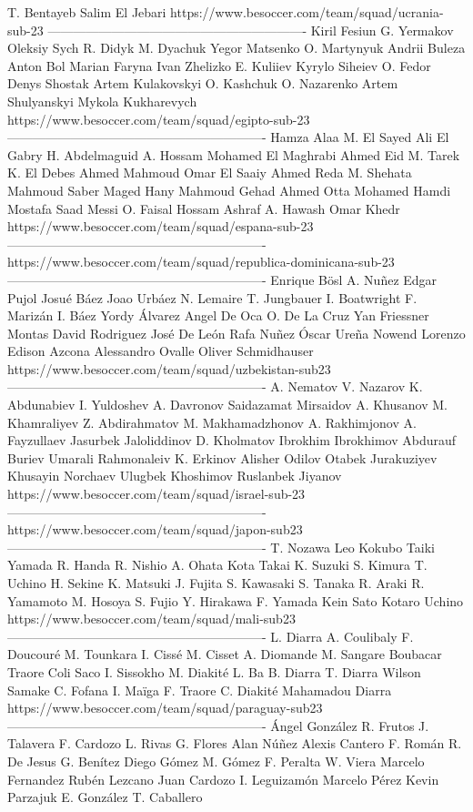 T. Bentayeb
Salim El Jebari
https://www.besoccer.com/team/squad/ucrania-sub-23 
------------------------------------------------------------- 
Kiril Fesiun
G. Yermakov
Oleksiy Sych
R. Didyk
M. Dyachuk
Yegor Matsenko
O. Martynyuk
Andrii Buleza
Anton Bol
Marian Faryna
Ivan Zhelizko
E. Kuliiev
Kyrylo Siheiev
O. Fedor
Denys Shostak
Artem Kulakovskyi
O. Kashchuk
O. Nazarenko
Artem Shulyanskyi
Mykola Kukharevych
https://www.besoccer.com/team/squad/egipto-sub-23 
------------------------------------------------------------- 
Hamza Alaa
M. El Sayed
Ali El Gabry
H. Abdelmaguid
A. Hossam
Mohamed El Maghrabi
Ahmed Eid
M. Tarek
K. El Debes
Ahmed Mahmoud
Omar El Saaiy
Ahmed Reda
M. Shehata
Mahmoud Saber
Maged Hany
Mahmoud Gehad
Ahmed Otta
Mohamed Hamdi
Mostafa Saad Messi
O. Faisal
Hossam Ashraf
A. Hawash
Omar Khedr
https://www.besoccer.com/team/squad/espana-sub-23 
------------------------------------------------------------- 
https://www.besoccer.com/team/squad/republica-dominicana-sub-23 
------------------------------------------------------------- 
Enrique Bösl
A. Nuñez
Edgar Pujol
Josué Báez
Joao Urbáez
N. Lemaire
T. Jungbauer
I. Boatwright
F. Marizán
I. Báez
Yordy Álvarez
Angel De Oca
O. De La Cruz
Yan Friessner Montas
David Rodriguez
José De León
Rafa Nuñez
Óscar Ureña
Nowend Lorenzo
Edison Azcona
Alessandro Ovalle
Oliver Schmidhauser
https://www.besoccer.com/team/squad/uzbekistan-sub23 
------------------------------------------------------------- 
A. Nematov
V. Nazarov
K. Abdunabiev
I. Yuldoshev
A. Davronov
Saidazamat Mirsaidov
A. Khusanov
M. Khamraliyev
Z. Abdirahmatov
M. Makhamadzhonov
A. Rakhimjonov
A. Fayzullaev
Jasurbek Jaloliddinov
D. Kholmatov
Ibrokhim Ibrokhimov
Abdurauf Buriev
Umarali Rahmonaleiv
K. Erkinov
Alisher Odilov
Otabek Jurakuziyev
Khusayin Norchaev
Ulugbek Khoshimov
Ruslanbek Jiyanov
https://www.besoccer.com/team/squad/israel-sub-23 
------------------------------------------------------------- 
https://www.besoccer.com/team/squad/japon-sub23 
------------------------------------------------------------- 
T. Nozawa
Leo Kokubo
Taiki Yamada
R. Handa
R. Nishio
A. Ohata
Kota Takai
K. Suzuki
S. Kimura
T. Uchino
H. Sekine
K. Matsuki
J. Fujita
S. Kawasaki
S. Tanaka
R. Araki
R. Yamamoto
M. Hosoya
S. Fujio
Y. Hirakawa
F. Yamada
Kein Sato
Kotaro Uchino
https://www.besoccer.com/team/squad/mali-sub23 
------------------------------------------------------------- 
L. Diarra
A. Coulibaly
F. Doucouré
M. Tounkara
I. Cissé
M. Cisset
A. Diomande
M. Sangare
Boubacar Traore
Coli Saco
I. Sissokho
M. Diakité
L. Ba
B. Diarra
T. Diarra
Wilson Samake
C. Fofana
I. Maïga
F. Traore
C. Diakité
Mahamadou Diarra
https://www.besoccer.com/team/squad/paraguay-sub23 
------------------------------------------------------------- 
Ángel González
R. Frutos
J. Talavera
F. Cardozo
L. Rivas
G. Flores
Alan Núñez
Alexis Cantero
F. Román
R. De Jesus
G. Benítez
Diego Gómez
M. Gómez
F. Peralta
W. Viera
Marcelo Fernandez
Rubén Lezcano
Juan Cardozo
I. Leguizamón
Marcelo Pérez
Kevin Parzajuk
E. González
T. Caballero
